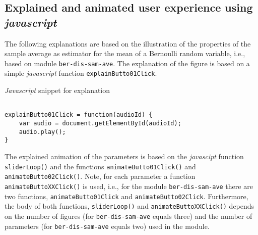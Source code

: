 \documentclass[12pt]{article}
\begin{document}
\subsection{Explained and animated user experience using \emph{javascript}}

The following explanations are based on the illustration of the properties of the sample average as estimator for the mean of a Bernoulli random variable, i.e., based on module \texttt{ber-dis-sam-ave}. 
%
The explanation of the figure is based on a simple \emph{javascript} function \texttt{explainButto01Click}.

\begin{CodeSnippet}[!hp]
	\centering
	\caption{\emph{Javascript} snippet for explanation}
\vspace{0.25cm}
	\begin{BVerbatim}

explainButto01Click = function(audioId) {
	var audio = document.getElementById(audioId);
	audio.play();
}

	\end{BVerbatim}
	\vspace*{-2mm}
	\label{JsCodSniExp}
\end{CodeSnippet}

The explained animation of the parameters is based on the \emph{javascipt} function \texttt{sliderLoop()} and the functions \texttt{animateButto01Click()} and \texttt{animateButto02Click()}. 
%
Note, for each parameter a function \texttt{animateButtoXXClick()} is used, i.e., for the module \texttt{ber-dis-sam-ave} there are two functions, \texttt{animateButto01Click} and \texttt{animateButto02Click}. 
%
%
Furthermore, the body of both functions, \texttt{sliderLoop()} and \texttt{animateButtoXXClick()} depends on the number of figures (for \texttt{ber-dis-sam-ave} equals three) and the number of parameters (for \texttt{ber-dis-sam-ave} equals two) used in the module.
\end{document}
